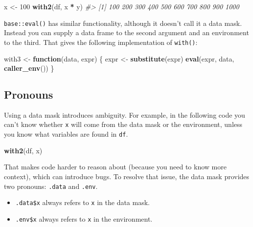 \documentclass[]{book}
\newenvironment{Shaded}{\begin{snugshade}}{\end{snugshade}}
\newcommand{\CommentTok}[1]{\textcolor[rgb]{0.37,0.37,0.37}{\textit{#1}}}
\newcommand{\ControlFlowTok}[1]{\textcolor[rgb]{0.27,0.27,0.27}{\textbf{#1}}}
\newcommand{\DecValTok}[1]{\textcolor[rgb]{0.06,0.06,0.06}{#1}}
\newcommand{\KeywordTok}[1]{\textcolor[rgb]{0.27,0.27,0.27}{\textbf{#1}}}
\newcommand{\NormalTok}[1]{#1}
\newcommand{\OperatorTok}[1]{\textcolor[rgb]{0.43,0.43,0.43}{\textbf{#1}}}
\newcommand{\StringTok}[1]{\textcolor[rgb]{0.5,0.5,0.5}{#1}}
\providecommand{\tightlist}{%
  \setlength{\itemsep}{0pt}\setlength{\parskip}{0pt}}
\begin{document}
\begin{Shaded}
\begin{Highlighting}[]
\NormalTok{x <-}\StringTok{ }\DecValTok{100}
\KeywordTok{with2}\NormalTok{(df, x }\OperatorTok{*}\StringTok{ }\NormalTok{y)}
\CommentTok{#>  [1]  100  200  300  400  500  600  700  800  900 1000}
\end{Highlighting}
\end{Shaded}

\texttt{base::eval()} has similar functionality, although it doesn't call it a data mask. Instead you can supply a data frame to the second argument and an environment to the third. That gives the following implementation of \texttt{with()}:

\begin{Shaded}
\begin{Highlighting}[]
\NormalTok{with3 <-}\StringTok{ }\ControlFlowTok{function}\NormalTok{(data, expr) \{}
\NormalTok{  expr <-}\StringTok{ }\KeywordTok{substitute}\NormalTok{(expr)}
  \KeywordTok{eval}\NormalTok{(expr, data, }\KeywordTok{caller_env}\NormalTok{())}
\NormalTok{\}}
\end{Highlighting}
\end{Shaded}

\hypertarget{pronouns}{%
\subsection{Pronouns}\label{pronouns}}


Using a data mask introduces ambiguity. For example, in the following code you can't know whether \texttt{x} will come from the data mask or the environment, unless you know what variables are found in \texttt{df}.

\begin{Shaded}
\begin{Highlighting}[]
\KeywordTok{with2}\NormalTok{(df, x)}
\end{Highlighting}
\end{Shaded}

That makes code harder to reason about (because you need to know more context), which can introduce bugs. To resolve that issue, the data mask provides two pronouns: \texttt{.data} and \texttt{.env}.

\begin{itemize}
\tightlist
\item
  \texttt{.data\$x} always refers to \texttt{x} in the data mask.
\item
  \texttt{.env\$x} always refers to \texttt{x} in the environment.
\end{itemize}
\end{document}

